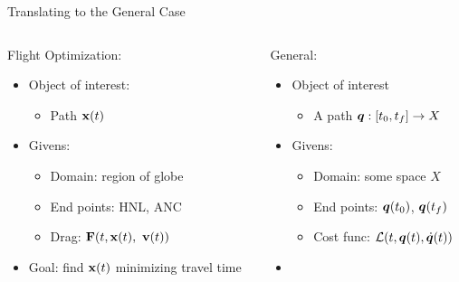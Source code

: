\documentclass{fkpresentation}
\begin{document}
\begin{frame}{Translating to the General Case}
  \begin{columns}
    \begin{column}{0.5\textwidth}
      {\large Flight Optimization:}\\[.75em]
      \begin{itemize}
        \item Object of interest:
          \begin{itemize}
            \item Path $\mathbf{x}(t)$
          \end{itemize}
        \item Givens:
          \begin{itemize}
            \item Domain: region of globe
            \item End points: HNL, ANC
            \item Drag: $\mathbf{F}(t, \mathbf{x}(t),\ \mathbf{v}(t))$
          \end{itemize}
        \item Goal: find $\mathbf{x}(t)$ minimizing travel time
      \end{itemize}
    \end{column}\pause
    \begin{column}{0.5\textwidth}
      {\large General:}\\[.75em]
      \begin{itemize}
        \item Object of interest
          \begin{itemize}
            \item A path $\bm q : [t_0, t_f] \to X$
          \end{itemize}
        \item Givens:
          \begin{itemize}
            \item Domain: some space $X$
            \item End points: $\bm q(t_0)$, $\bm q(t_f)$
            \item Cost func: $\mathcal{L}(t, \bm q(t), \dot {\bm q}(t))$
          \end{itemize}
        \item
      \end{itemize}
    \end{column}
  \end{columns}
\end{frame}
\end{document}
